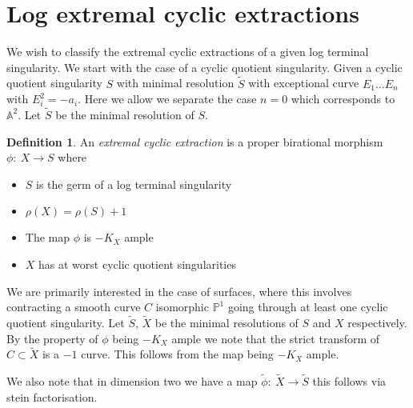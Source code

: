 \documentclass[11pt]{amsart}
\theoremstyle{definition}
\theoremstyle{definition}
\theoremstyle{definition}
\theoremstyle{definition}
\newtheorem{dfn}[thm]{Definition}
\theoremstyle{definition}
\theoremstyle{definition}
\theoremstyle{definition}
\theoremstyle{definition}
\newcommand{\mb}[1]{\mathbb{#1}}
\newcommand{\ra}{\rightarrow}
\newcommand{\wt}[1]{\widetilde{#1}}
\begin{document}
 


\section{Log extremal cyclic extractions}


We wish to classify the extremal cyclic extractions of a given log terminal singularity. We start with the case of a cyclic quotient singularity. Given a cyclic quotient singularity $S$ with minimal resolution $\wt{S}$ with exceptional curve $E_1 \dots E_n$ with $E_i^2 = -a_i$. Here we allow we separate the case $n=0$ which corresponds to $\mathbb{A}^2$. Let $\widetilde{S}$ be the minimal resolution of $S$.

\begin{dfn}
An \emph{extremal cyclic extraction} is a proper birational morphism $\phi : \: X \ra S$ where
\begin{itemize}

\item $S$ is the germ of a log terminal singularity
\item $\rho(X) = \rho(S) + 1$
\item The map $\phi$ is $-K_X$ ample
\item $X$ has at worst cyclic quotient singularities
\end{itemize}
\end{dfn}
 
 We are primarily interested in the case of surfaces, where this involves contracting a smooth curve $C$ isomorphic $\mb{P}^1$ going through at least one cyclic quotient singularity. Let $\wt{S}$, $\wt{X}$ be the minimal resolutions of $S$ and $X$ respectively. By the property of $\phi$ being $-K_X$ ample we note that the strict transform of $C \subset \wt{X}$ is a $-1$ curve. This follows from the map being $-K_X$ ample. 
 
 
 We also note that in dimension two we have a map $\wt{\phi} : \: \wt{X} \ra \wt{S}$ this follows via stein factorisation.
 
\end{document}
